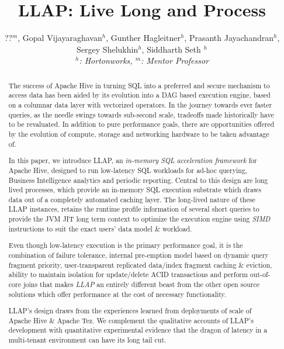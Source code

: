 \documentclass{vldb}
\begin{document}
\title{LLAP: Live Long and Process}

\author{
\alignauthor
??$^m$, Gopal Vijayaraghavan$^h$, Gunther Hagleitner$^h$, Prasanth Jayachandran$^h$, \\ 
Sergey Shelukhin$^h$, Siddharth Seth $^h$
\\
{\large \emph{$^h$: Hortonworks, $^m$: Mentor Professor}}
}

\maketitle

\begin{abstract}
The success of Apache Hive in turning SQL into a preferred and secure mechanism to
access data has been aided by its evolution into a DAG based execution engine, based on
a columnar data layer with vectorized operators. In the journey towards ever faster queries,
as the needle swings towards sub-second scale, tradeoffs made historically have to be revaluated.  
In addition to pure performance goals, there are opportunities offered by the evolution of compute, storage 
and networking hardware to be taken advantage of.


In this paper, we introduce LLAP, an \emph{in-memory SQL acceleration framework} for Apache Hive, designed
to run low-latency SQL workloads for ad-hoc querying, Business Intelligence analytics and periodic reporting.
Central to this design are long lived processes, which provide an in-memory SQL execution substrate which draws
data out of a completely automated caching layer. The long-lived nature of these LLAP instances, retains the runtime profile
information of several short queries to provide the JVM JIT long term context to optimize the execution engine
using \emph{SIMD} instructions to suit the exact users' data model \& workload.


Even though low-latency execution is the primary performance goal, it is the combination of failure tolerance, 
internal pre-emption model based on dynamic query fragment priority, user-transparent replicated data/index fragment
caching \& eviction, ability to maintain isolation for update/delete ACID transactions and perform out-of-core joins 
that makes \emph{LLAP} an entirely different beast from the other open source solutions which offer performance at the cost
of necessary functionality.


LLAP's design draws from the experiences learned from deployments of scale of Apache Hive \& Apache Tez. We complement
the qualitative accounts of LLAP's development with quantitative experimental evidence that the dragon of latency in
a multi-tenant environment can have its long tail cut.
\end{abstract}
\end{document}
